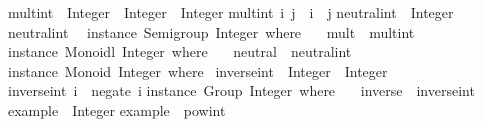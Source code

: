 \begin{isabellebody}
\begin{isamarkuptext}
\isanewline
mult{}int\ {}{}\ Integer\ {}{}\ Integer\ {}{}\ Integer{}\isanewline
mult{}int\ i\ j\ {}\ i\ {}\ j{}\isanewline
\isanewline
neutral{}int\ {}{}\ Integer{}\isanewline
neutral{}int\ {}\ {}{}\isanewline
\isanewline
instance\ Semigroup\ Integer\ where\ {}\isanewline
\ \ mult\ {}\ mult{}int{}\isanewline
{}{}\isanewline
\isanewline
instance\ Monoidl\ Integer\ where\ {}\isanewline
\ \ neutral\ {}\ neutral{}int{}\isanewline
{}{}\isanewline
\isanewline
instance\ Monoid\ Integer\ where\ {}\isanewline
{}{}\isanewline
\isanewline
inverse{}int\ {}{}\ Integer\ {}{}\ Integer{}\isanewline
inverse{}int\ i\ {}\ negate\ i{}\isanewline
\isanewline
instance\ Group\ Integer\ where\ {}\isanewline
\ \ inverse\ {}\ inverse{}int{}\isanewline
{}{}\isanewline
\isanewline
example\ {}{}\ Integer{}\isanewline
example\ {}\ pow{}int\ {}{}\ {}{}{}{}{}\isanewline

\end{isamarkuptext}
\end{isabellebody}
